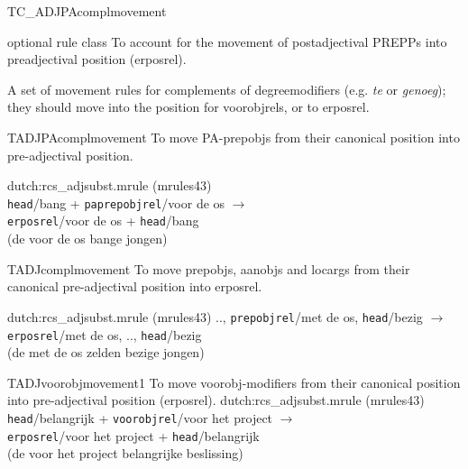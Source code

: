 \begin{mruleclass}{TC\_ADJPAcomplmovement}
\begin{classdescr}
\kind optional rule class 
\classtask To account for the movement of postadjectival PREPPs into 
preadjectival position (erposrel).
\classremarks 
\nofilters
\nospeedrules
\begin{plannedrules}
\item
A set of movement rules for complements 
of degreemodifiers (e.g. {\em te} or {\em genoeg}); 
they should move into the position for voorobjrels, or to
erposrel. 
\end{plannedrules}
\end{classdescr}

\begin{members}
\begin{member}
 TADJPAcomplmovement
  To move PA-prepobjs from their canonical position into 
pre-adjectival position.

\file dutch:rcs\_adjsubst.mrule (mrules43)
\semantics \nosemantics
\example \mbox{}\\
{\tt head}/bang + {\tt paprepobjrel}/voor de os $\rightarrow$ \\
{\tt erposrel}/voor de os + {\tt head}/bang\\
 (de voor de os bange jongen)
\remarks\mbox{}
\end{member}
\begin{member}
 TADJcomplmovement
   To move prepobjs, aanobjs and locargs 
from their canonical pre-adjectival position into 
erposrel.

\file dutch:rcs\_adjsubst.mrule (mrules43)
\semantics \nosemantics
\example .., {\tt prepobjrel}/met de os, {\tt head}/bezig $\rightarrow$ 
{\tt erposrel}/met de os, .., {\tt head}/bezig\\
(de met de os zelden bezige jongen)

\remarks\mbox{}
\end{member}
\begin{member}
 TADJvoorobjmovement1
  To move voorobj-modifiers from their canonical position into 
pre-adjectival position (erposrel).
\file dutch:rcs\_adjsubst.mrule (mrules43)
\semantics \nosemantics
\example \mbox{}\\
{\tt head}/belangrijk + {\tt voorobjrel}/voor het project 
$\rightarrow$ \\
{\tt erposrel}/voor 
het project + {\tt head}/belangrijk\\
(de voor het project belangrijke beslissing)
 
\remarks\mbox{}
\end{member}

\end{members}

\end{mruleclass}
